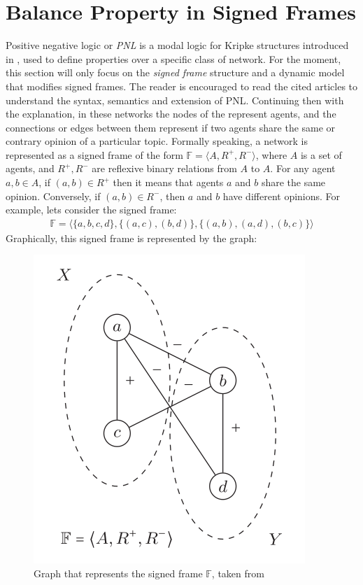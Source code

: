 \section{Balance Property in Signed Frames}
Positive negative logic or \textit{PNL} is a modal logic for Kripke structures introduced in \cite{PNL1, PNL2}, used to define properties over a specific class of network. For the moment, this section will only focus on the \textit{signed frame} structure and a dynamic model that modifies signed frames. The reader is encouraged to read the cited articles to understand the syntax, semantics and extension of PNL. Continuing then with the explanation, in these networks the nodes of the represent agents, and the connections or edges between them represent if two agents share the same or contrary opinion of a particular topic. Formally speaking, a network is represented as a signed frame of the form $\mathbb{F} = \langle A, R^+, R^- \rangle$, where $A$ is a set of agents, and $R^+,R^-$ are reflexive binary relations from $A$ to $A$. For any agent $a,b \in A$, if $(a,b) \in R^+$ then it means that agents $a$ and $b$ share the same opinion. Conversely, if $(a,b) \in R^-$, then $a$ and $b$ have different opinions. For example, lets consider the signed frame:
\begin{align*}
    \mathbb{F} = \langle \{a,b,c,d\}, \{(a,c),(b,d)\},\{(a,b),(a,d), (b,c)\} \rangle
\end{align*}
Graphically, this signed frame is represented by the graph:
\begin{figure}[H]
    \centering
    \includegraphics[scale = 0.5]{images/CS10.png}
    \caption{Graph that represents the signed frame $\mathbb{F}$, taken from \cite{PNL1}}
    \label{fig:CS10}
\end{figure}
